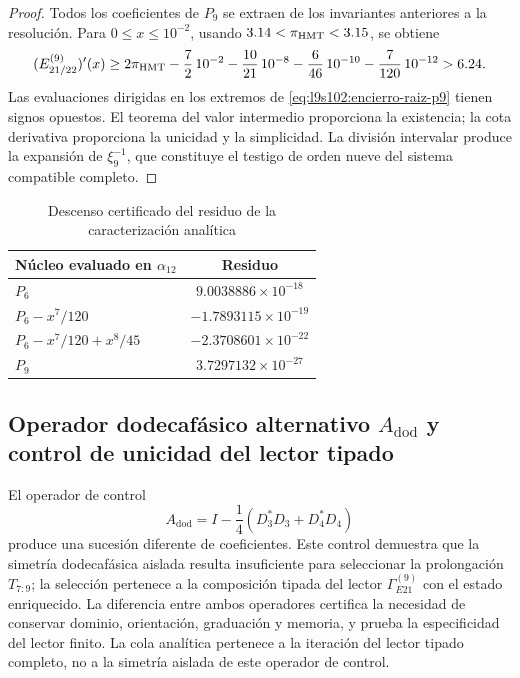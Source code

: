 \begin{proof}
Todos los coeficientes de \(P_9\) se extraen de los invariantes anteriores a
la resolución. Para \(0\leq x\leq10^{-2}\), usando
\(3.14<\pi_{\rm HMT}<3.15\), se obtiene
\[
 (E_{21/22}^{(9)})'(x)
 \geq 2\pi_{\rm HMT}-\frac72\,10^{-2}
 -\frac{10}{21}\,10^{-8}-\frac6{46}\,10^{-10}
 -\frac7{120}\,10^{-12}>6.24.
\]
Las evaluaciones dirigidas en los extremos de
\cref{eq:l9s102:encierro-raiz-p9} tienen signos opuestos. El teorema del
valor intermedio proporciona la existencia; la cota derivativa proporciona
la unicidad y la simplicidad. La división intervalar produce la expansión de
\(\xi_9^{-1}\), que constituye el testigo de orden nueve del sistema
compatible completo.
\end{proof}

\begin{table}[htbp]
\centering
\caption{Descenso certificado del residuo de la caracterización analítica}
\label{tab:l9s102:alpha-residuos}
\begin{tabular}{@{}lc@{}}
\toprule
Núcleo evaluado en \(\alpha_{12}\) & Residuo \\
\midrule
\(P_6\) & \(9.0038886\times10^{-18}\) \\
\(P_6-x^7/120\) & \(-1.7893115\times10^{-19}\) \\
\(P_6-x^7/120+x^8/45\) & \(-2.3708601\times10^{-22}\) \\
\(P_9\) & \(3.7297132\times10^{-27}\) \\
\bottomrule
\end{tabular}
\end{table}

\subsection{Operador dodecafásico alternativo \texorpdfstring{\(A_{\mathrm{dod}}\)}{A_dod} y control de unicidad del lector tipado}
\label{sec:l9s102:alpha-control}

El operador de control
\begin{equation}
 A_{\mathrm{dod}}
 =I-\frac14(D_3^*D_3+D_4^*D_4)
 \label{eq:l9s102:alpha-control-alternativo}
\end{equation}
produce una sucesión diferente de coeficientes. Este control demuestra que
la simetría dodecafásica aislada resulta insuficiente para seleccionar la
prolongación \(T_{7:9}\); la selección pertenece a la composición tipada del
lector \(\Gamma_{E21}^{(9)}\) con el estado enriquecido. La diferencia entre
ambos operadores certifica la necesidad de conservar dominio, orientación,
graduación y memoria, y prueba la especificidad del lector finito. La cola
analítica pertenece a la iteración del lector tipado completo, no a la
simetría aislada de este operador de control.

